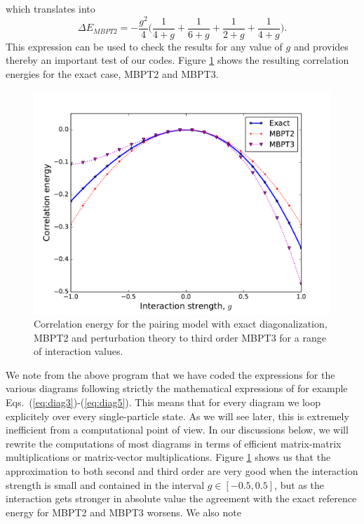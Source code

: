 which translates into
  \[
  \Delta E_{MBPT2} = -\frac{g^2}{4} \bigg( \frac{1}{ 4 + g} +
  \frac{1}{ 6 + g} + \frac{1}{ 2 + g} + \frac{1}{ 4 + g} \bigg).
  \]
 This expression can be used to check the results
  for any value of $g$ and provides thereby an important test of  our codes.
Figure \ref{fig:diagpairing} shows the resulting correlation energies for the exact case, MBPT2 and MBPT3.
  \begin{figure}
    \includegraphics[width=\linewidth]{Chapter8-figures/perturbationtheory.pdf}
    \caption{Correlation energy for the pairing model with exact diagonalization, MBPT2 and perturbation theory to third order MBPT3 for a range of interaction values.}
    \label{fig:diagpairing}
  \end{figure}
We note from the above program that we have coded the expressions for the various diagrams
following strictly the mathematical expressions of for example Eqs.~(\ref{eq:diag3})-(\ref{eq:diag5}).
This means that for every diagram we loop explicitely  over every single-particle state. As we will
  see later, this is extremely inefficient from a computational point
  of view. In our discussions below, we will rewrite
  the computations of most diagrams in terms of efficient
  matrix-matrix multiplications or matrix-vector multiplications.  
  Figure \ref{fig:diagpairing} shows us that the approximation to both
  second and third order are very good when the interaction strength
  is small and contained in the interval $g\in[-0.5,0.5]$, but as the
  interaction gets stronger in absolute value the agreement  with the exact reference energy for  MBPT2 and MBPT3 worsens. We also note
